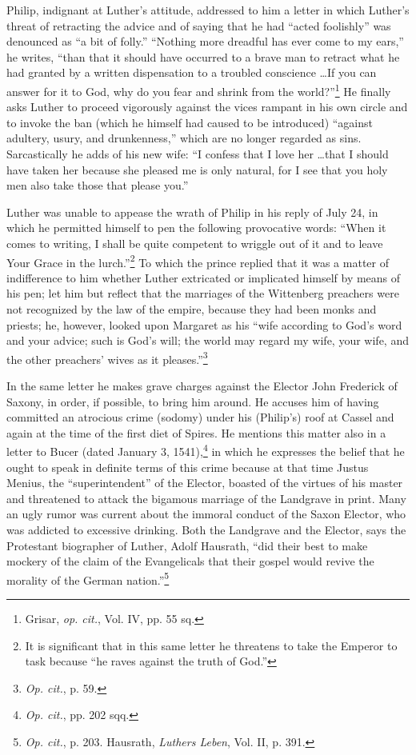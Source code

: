 Philip, indignant at Luther’s attitude, addressed to him a letter
in which Luther’s threat of retracting the advice and of saying that
he had “acted foolishly” was denounced as “a bit of folly.” “Nothing
more dreadful has ever come to my ears,” he writes, “than that it
should have occurred to a brave man to retract what he had granted
by a written dispensation to a troubled conscience \dots If you can
answer for it to God, why do you fear and shrink from the world?”\footnote
{Grisar, \textit{op. cit.}, Vol. IV, pp. 55 sq.}
He finally asks Luther to proceed vigorously against the vices rampant
in his own circle and to invoke the ban (which he himself had caused
to be introduced) “against adultery, usury, and drunkenness,” which
are no longer regarded as sins. Sarcastically he adds of his new wife:
“I confess that I love her \dots that I should have taken her because
she pleased me is only natural, for I see that you holy men also take
those that please you.”

Luther was unable to appease the wrath of Philip in his reply of
July 24, in which he permitted himself to pen the following provocative
words: “When it comes to writing, I shall be quite competent to
wriggle out of it and to leave Your Grace in the lurch.”\footnote
{It is significant that in this same letter he threatens to take the Emperor to task because
“he raves against the truth of God.”}
To which
the prince replied that it was a matter of indifference to him whether
Luther extricated or implicated himself by means of his pen; let him
but reflect that the marriages of the Wittenberg preachers were not
recognized by the law of the empire, because they had been monks
and priests; he, however, looked upon Margaret as his “wife according
to God’s word and your advice; such is God’s will; the world
may regard my wife, your wife, and the other preachers’ wives as it
pleases.”\footnote{\textit{Op. cit.}, p. 59.}

In the same letter he makes grave charges against the Elector John
Frederick of Saxony, in order, if possible, to bring him around. He
accuses him of having committed an atrocious crime (sodomy) under
his (Philip’s) roof at Cassel and again at the time of the first diet
of Spires. He mentions this matter also in a letter to Bucer (dated
January 3, 1541),\footnote{\textit{Op. cit.}, pp. 202 sqq.}
 in which he expresses the belief that he ought
to speak in definite terms of this crime because at that time Justus
Menius, the “superintendent” of the Elector, boasted of the virtues
of his master and threatened to attack the bigamous marriage of the
Landgrave in print. Many an ugly rumor was current about the immoral conduct
of the Saxon Elector, who was addicted to excessive
drinking. Both the Landgrave and the Elector, says the Protestant
biographer of Luther, Adolf Hausrath, “did their best to make mockery
of the claim of the Evangelicals that their gospel would revive
the morality of the German nation.”\footnote{\textit{Op. cit.}, p. 203. Hausrath, \textit{Luthers Leben}, Vol. II, p. 391.}

